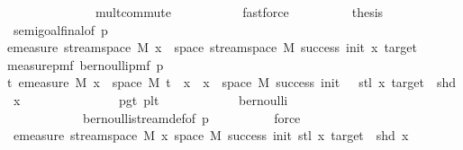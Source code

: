 \begin{isabellebody}
\ \ \ \ \ \ \ \ \ \ \ \ \ \ mult{\isachardot}{\kern0pt}commute\ \isanewline
\ \ \ \ \ \ \ \ \isamarkupfalse%
\ fastforce\isanewline
\ \ \ \ \ \ \isamarkupfalse%
\ \isamarkupfalse%
\ {\isacharquery}{\kern0pt}thesis\isanewline
\ \ \ \ \ \ \ \ \isamarkupfalse%
\ semi{\isacharunderscore}{\kern0pt}goal{}{\isacharunderscore}{\kern0pt}final{\isacharbrackleft}{\kern0pt}of\ p\ \isanewline
{\isachardoublequoteopen}emeasure\ {\isacharparenleft}{\kern0pt}stream{\isacharunderscore}{\kern0pt}space\ {\isacharquery}{\kern0pt}M{\isacharparenright}{\kern0pt}\ {\isacharbraceleft}{\kern0pt}x\ {\isasymin}\ space\ {\isacharparenleft}{\kern0pt}stream{\isacharunderscore}{\kern0pt}space\ {\isacharquery}{\kern0pt}M{\isacharparenright}{\kern0pt}{\isachardot}{\kern0pt}\ success\ {\isacharparenleft}{\kern0pt}init{\isacharplus}{\kern0pt}{}{\isacharparenright}{\kern0pt}\ {\isacharparenleft}{\kern0pt}x{\isacharparenright}{\kern0pt}\ target{\isacharbraceright}{\kern0pt}{\isachardoublequoteclose}\ \isanewline
{\isachardoublequoteopen}measure{\isacharunderscore}{\kern0pt}pmf\ {\isacharparenleft}{\kern0pt}bernoulli{\isacharunderscore}{\kern0pt}pmf\ p{\isacharparenright}{\kern0pt}{\isachardoublequoteclose}\isanewline
{\isachardoublequoteopen}{\isasymlambda}t{\isachardot}{\kern0pt}\ emeasure\ M\ {\isacharbraceleft}{\kern0pt}x\ {\isasymin}\ space\ M{\isachardot}{\kern0pt}\ t\ {\isacharhash}{\kern0pt}{\isacharhash}{\kern0pt}\ x\ {\isasymin}\ {\isacharbraceleft}{\kern0pt}x\ {\isasymin}\ space\ M{\isachardot}{\kern0pt}\ success\ {\isacharparenleft}{\kern0pt}init\ {\isacharplus}{\kern0pt}\ {}{\isacharparenright}{\kern0pt}\ {\isacharparenleft}{\kern0pt}stl\ x{\isacharparenright}{\kern0pt}\ target\ {\isasymand}\ shd\ x{\isacharbraceright}{\kern0pt}{\isacharbraceright}{\kern0pt}{\isachardoublequoteclose}{\isacharbrackright}{\kern0pt}\ \ \ \isanewline
\ \ \ \ \ \ \ \ \ \ \ \ p{\isacharunderscore}{\kern0pt}gt{\isacharunderscore}{\kern0pt}{}\ p{\isacharunderscore}{\kern0pt}lt{\isacharunderscore}{\kern0pt}{}\isanewline
\ \ \ \ \ \ \ \ \ \ \ \ bernoulli\isanewline
\ \ \ \ \ \ \ \ \ \ \ \ bernoulli{\isacharunderscore}{\kern0pt}stream{\isacharunderscore}{\kern0pt}def{\isacharbrackleft}{\kern0pt}of\ p{\isacharbrackright}{\kern0pt}\isanewline
\ \ \ \ \ \ \ \ \isamarkupfalse%
\ force\isanewline
\ \ \ \ \isamarkupfalse%
\isanewline
\ \ \ \ \isamarkupfalse%
\ \isamarkupfalse%
\ {\isachardoublequoteopen}emeasure\ {\isacharparenleft}{\kern0pt}stream{\isacharunderscore}{\kern0pt}space\ {\isacharquery}{\kern0pt}M{\isacharparenright}{\kern0pt}\ {\isacharbraceleft}{\kern0pt}x{\isasymin}\ space\ M{\isachardot}{\kern0pt}\ success\ {\isacharparenleft}{\kern0pt}init{\isacharplus}{\kern0pt}{}{\isacharparenright}{\kern0pt}\ {\isacharparenleft}{\kern0pt}stl\ x{\isacharparenright}{\kern0pt}\ target\ {\isasymand}\ shd\ x{\isacharbraceright}{\kern0pt}\ \isanewline

\end{isabellebody}
